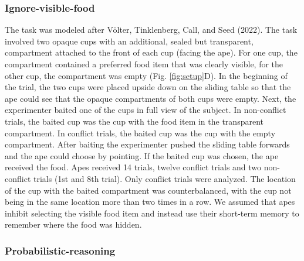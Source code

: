 \documentclass[
  man,floatsintext]{apa6}
\begin{document}
\subsubsection{Ignore-visible-food}\label{ignore-visible-food}

The task was modeled after Völter, Tinklenberg, Call, and Seed (2022). The task involved two opaque cups with an additional, sealed but transparent, compartment attached to the front of each cup (facing the ape). For one cup, the compartment contained a preferred food item that was clearly visible, for the other cup, the compartment was empty (Fig. \ref{fig:setup}D). In the beginning of the trial, the two cups were placed upside down on the sliding table so that the ape could see that the opaque compartments of both cups were empty. Next, the experimenter baited one of the cups in full view of the subject. In non-conflict trials, the baited cup was the cup with the food item in the transparent compartment. In conflict trials, the baited cup was the cup with the empty compartment. After baiting the experimenter pushed the sliding table forwards and the ape could choose by pointing. If the baited cup was chosen, the ape received the food. Apes received 14 trials, twelve conflict trials and two non-conflict trials (1st and 8th trial). Only conflict trials were analyzed. The location of the cup with the baited compartment was counterbalanced, with the cup not being in the same location more than two times in a row. We assumed that apes inhibit selecting the visible food item and instead use their short-term memory to remember where the food was hidden.

\subsubsection{Probabilistic-reasoning}\label{probabilistic-reasoning}
\end{document}
